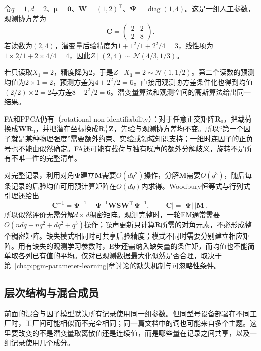 \begin{example}[两台传感器对一个连续因子的测量]
  \label{ex:pgm-static-directed-fa-missing}
  令$q=1,d=2$、$\bm{\mu}=\bm{0}$、$\bm{W}=(1,2)^\top$、$\bm{\Psi}=\operatorname{diag}(1,4)$。这是一组人工参数，观测协方差为
  \[
    \bm{C}=\begin{pmatrix}2&2\\2&8\end{pmatrix}.
  \]
  若读数为$(2,4)$，潜变量后验精度为$1+1^2/1+2^2/4=3$，线性项为$1\times2/1+2\times4/4=4$，因此$Z\mid(2,4)\sim\mathcal{N}(4/3,1/3)$。

  若只读取$X_1=2$，精度降为$2$，于是$Z\mid X_1=2\sim\mathcal{N}(1,1/2)$。第二个读数的预测均值为$2\times1=2$，预测方差为$4+2^2/2=6$。直接用观测协方差条件化也得到均值$(2/2)\times2=2$与方差$8-2^2/2=6$。潜变量算法和观测空间的高斯算法给出同一结果。
\end{example}

FA和PPCA仍有（rotational non-identifiability）：对于任意正交矩阵$\bm{R}_0$，把载荷换成$\bm{W}\bm{R}_0$，并把潜在坐标换成$\bm{R}_0^\top\bm{Z}$，先验与观测协方差均不变。所以“第一个因子就是某种物理强度”需要额外约束、实验或领域知识支持；一维时连因子的正负号也不能由似然确定。FA还可能有载荷与独有噪声的额外分解歧义，旋转不是所有不唯一性的完整清单。

对完整记录，利用对角$\bm{\Psi}$建立$\bm{M}$需要$O(dq^2)$操作，分解$\bm{M}$需要$O(q^3)$，随后每条记录的后验均值可用预计算矩阵在$O(dq)$内求得。Woodbury恒等式与行列式引理还给出
\[
  \bm{C}^{-1}=\bm{\Psi}^{-1}
    -\bm{\Psi}^{-1}\bm{W}\bm{S}\bm{W}^{\top}\bm{\Psi}^{-1},
  \qquad |\bm{C}|=|\bm{\Psi}|\,|\bm{M}|,
\]
所以似然评价无需分解$d\times d$稠密矩阵。观测完整时，一轮EM通常需要$O(ndq+nq^2+dq^2+q^3)$操作；噪声更新只计算$\bm{R}$所需的对角元素，不必形成整个稠密矩阵。缺失模式相同时可共享后验精度；模式不同时需要分别建立相应矩阵。用有缺失的观测学习参数时，E步还需纳入缺失量的条件矩，而均值也不能简单取各列已有值的平均。仅对已观测数据最大化似然是否合理，取决于第~\ref{chap:pgm-parameter-learning}章讨论的缺失机制与可忽略性条件。

\subsection{层次结构与混合成员}
\label{sec:pgm-static-directed-hierarchy-membership}

前面的混合与因子模型默认所有记录使用同一组参数。但同型号设备部署在不同工厂时，工厂间可能相似而不完全相同；同一篇文档中的词也可能来自多个主题。这里要改变的不是潜变量取离散值还是连续值，而是哪些量在记录之间共享，以及一组记录使用几个成分。

